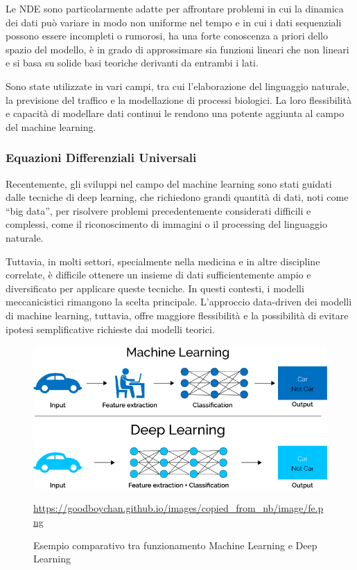 Le NDE sono particolarmente adatte per affrontare problemi in cui la dinamica dei dati può variare in modo non uniforme nel tempo e in cui i dati sequenziali possono essere incompleti o rumorosi, ha una forte conoscenza a priori 
dello spazio del modello, è in grado di approssimare sia funzioni 
lineari che non lineari e si basa su solide basi teoriche derivanti da 
entrambi i lati. 

Sono state utilizzate in vari campi, tra cui l'elaborazione del linguaggio naturale, la previsione del traffico e la modellazione di processi biologici. La loro flessibilità e capacità di modellare dati continui le rendono una potente aggiunta al campo del machine learning.

\subsubsection{Equazioni Differenziali Universali}

Recentemente, gli sviluppi nel campo del machine learning sono stati 
guidati dalle tecniche di deep learning, che richiedono grandi quantità 
di dati, noti come ``big data'', per risolvere problemi precedentemente 
considerati difficili e complessi, come il riconoscimento di immagini o 
il processing del linguaggio naturale.

Tuttavia, in molti settori, specialmente nella medicina e in altre 
discipline correlate, è difficile ottenere un insieme di dati 
sufficientemente ampio e diversificato per applicare queste tecniche. 
In questi contesti, i modelli meccanicistici rimangono la scelta 
principale. L'approccio data-driven dei modelli di machine learning, 
tuttavia, offre maggiore flessibilità e la possibilità di evitare 
ipotesi semplificative richieste dai modelli teorici.

\begin{figure}[H]
    \begin{center}
        \includegraphics[scale=0.4]{img/Caratteristiche-e-funzionamento-del-Deep-Learning-in-informatica.png}
        \caption{Esempio comparativo tra funzionamento Machine Learning e Deep Learning}
        \url{https://goodboychan.github.io/images/copied_from_nb/image/fe.png}
        \label{fig:ml_dl_example}
    \end{center}
\end{figure}

